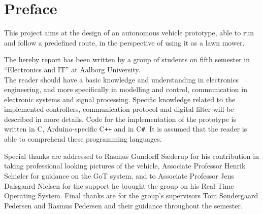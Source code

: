 \chapter*{Preface}
\vspace{-12 pt}
This project aims at the design of an autonomous vehicle prototype, able to run and follow a predefined route, in the perspective of using it as a lawn mower.

The hereby report has been written by a group of students on fifth semester in ``Electronics and IT'' at Aalborg University.\\
The reader should have a basic knowledge and understanding in electronics engineering, and more specifically in modelling and control, communication in electronic systems and signal processing. Specific knowledge related to the implemented controllers, communication protocol and digital filter will be described in more details. Code for the implementation of the prototype is written in C, Arduino-specific C\texttt{++} and in C\texttt{\#}. It is assumed that the reader is able to comprehend these programming languages.

Special thanks are addressed to Rasmus Gundorff Sæderup for his contribution in taking professional looking pictures of the vehicle, Associate Professor Henrik Schiøler for guidance on the GoT system, and to Associate Professor Jens Dalsgaard Nielsen for the support he brought the group on his Real Time Operating System. Final thanks are for the group's supervisors Tom Søndergaard Pedersen and Rasmus Pedersen and their guidance throughout the semester.

